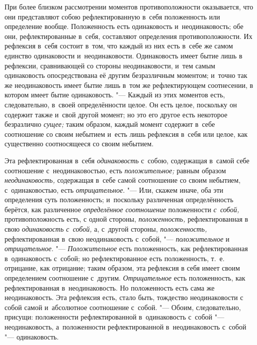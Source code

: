 При более близком рассмотрении моментов противоположности оказывается, что
они представляют собою рефлектированную в~себя положенность или определение
вообще. Положенность есть одинаковость и~неодинаковость; обе они,
рефлектированные в~себя, составляют определения противоположности. Их
рефлексия в~себя состоит в~том, что каждый из них есть в~себе же самом
единство одинаковости и~неодинаковости. Одинаковость имеет бытие лишь в
рефлексии, сравнивающей со стороны неодинаковости, и~тем самым одинаковость
опосредствована её другим безразличным моментом; и~точно так же
неодинаковость имеет бытие лишь в~том же рефлектирующем соотнесении, в
котором имеет бытие одинаковость. "--- Каждый из этих моментов есть,
следовательно, в~своей определённости целое. Он есть целое, поскольку он
содержит также и~свой другой момент; но это его другое есть некоторое
безразлично {\em сущее;} таким образом, каждый момент
содержит в~себе соотношение со своим небытием и~есть лишь рефлексия в~себя
или целое, как существенно соотносящееся со своим небытием.

Эта рефлектированная в~себя {\em одинаковость} с~собою,
содержащая в~самой себе соотношение с~неодинаковостью, есть
{\em положительное;} равным образом
{\em неодинаковость,} содержащая в~себе самой
соотношение со своим небытием, с~одинаковостью, есть
{\em отрицательное}. "--- Или, скажем иначе, оба эти
определения суть положенность; и~поскольку различенная определённость
берётся, как различенное {\em определённое соотношение}
положенности {\em с~собой,} противоположность есть, с
одной стороны, {\em положенность,} рефлектированная в
свою {\em одинаковость с~собой,} а, с~другой стороны,
{\em положенность,} рефлектированная в~свою
неодинаковость с~собой, "--- {\em положительное} и
{\em отрицательное}. "--- {\em Положительное} есть положенность, как
рефлектированная в~одинаковость с~собой; но рефлектированное есть
положенность, т.~е. отрицание, как отрицание; таким образом, эта рефлексия
в себя имеет своим определением соотношение с~другим.
{\em Отрицательное} есть положенность, как
рефлектированная в~неодинаковость. Но положенность есть сама же
неодинаковость. Эта рефлексия есть, стало быть, тождество неодинаковости с
собой самой и~абсолютное соотношение с~собой. "--- Обоим, следовательно,
присущи: положенности рефлектированной в~одинаковость с~собой
"--- неодинаковость, а~положенности рефлектированной в~неодинаковость с~собой
"--- одинаковость.

